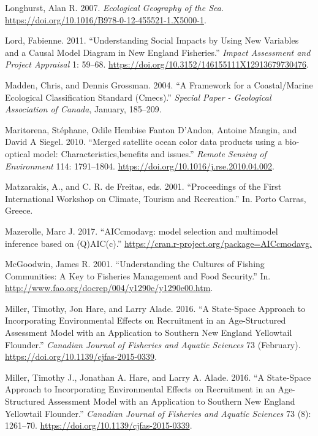 \documentclass[
]{book}
\newlength{\cslhangindent}
\newenvironment{cslreferences}%
  {\setlength{\parindent}{0pt}%
  \everypar{\setlength{\hangindent}{\cslhangindent}}\ignorespaces}%
  {\par}
\begin{document}
\begin{cslreferences}
\leavevmode\hypertarget{ref-Longhurst2007}{}%
Longhurst, Alan R. 2007. \emph{Ecological Geography of the Sea}. \url{https://doi.org/10.1016/B978-0-12-455521-1.X5000-1}.

\leavevmode\hypertarget{ref-lord_understanding_2011}{}%
Lord, Fabienne. 2011. ``Understanding Social Impacts by Using New Variables and a Causal Model Diagram in New England Fisheries.'' \emph{Impact Assessment and Project Appraisal} 1: 59--68. \url{https://doi.org/10.3152/146155111X12913679730476}.

\leavevmode\hypertarget{ref-madden2004}{}%
Madden, Chris, and Dennis Grossman. 2004. ``A Framework for a Coastal/Marine Ecological Classification Standard (Cmecs).'' \emph{Special Paper - Geological Association of Canada}, January, 185--209.

\leavevmode\hypertarget{ref-Maritorena2010}{}%
Maritorena, Stéphane, Odile Hembise Fanton D'Andon, Antoine Mangin, and David A Siegel. 2010. ``Merged satellite ocean color data products using a bio-optical model: Characteristics,benefits and issues.'' \emph{Remote Sensing of Environment} 114: 1791--1804. \url{https://doi.org/10.1016/j.rse.2010.04.002}.

\leavevmode\hypertarget{ref-matzarakis_proceedings_2001}{}%
Matzarakis, A., and C. R. de Freitas, eds. 2001. ``Proceedings of the First International Workshop on Climate, Tourism and Recreation.'' In. Porto Carras, Greece.

\leavevmode\hypertarget{ref-Mazerolle2017a}{}%
Mazerolle, Marc J. 2017. ``AICcmodavg: model selection and multimodel inference based on (Q)AIC(c).'' \url{https://cran.r-project.org/package=AICcmodavg.}

\leavevmode\hypertarget{ref-mcgoodwin_understanding_2001}{}%
McGoodwin, James R. 2001. ``Understanding the Cultures of Fishing Communities: A Key to Fisheries Management and Food Security.'' In. \url{http://www.fao.org/docrep/004/y1290e/y1290e00.htm}.

\leavevmode\hypertarget{ref-miller2016}{}%
Miller, Timothy, Jon Hare, and Larry Alade. 2016. ``A State-Space Approach to Incorporating Environmental Effects on Recruitment in an Age-Structured Assessment Model with an Application to Southern New England Yellowtail Flounder.'' \emph{Canadian Journal of Fisheries and Aquatic Sciences} 73 (February). \url{https://doi.org/10.1139/cjfas-2015-0339}.

\leavevmode\hypertarget{ref-miller_state-space_2016}{}%
Miller, Timothy J., Jonathan A. Hare, and Larry A. Alade. 2016. ``A State-Space Approach to Incorporating Environmental Effects on Recruitment in an Age-Structured Assessment Model with an Application to Southern New England Yellowtail Flounder.'' \emph{Canadian Journal of Fisheries and Aquatic Sciences} 73 (8): 1261--70. \url{https://doi.org/10.1139/cjfas-2015-0339}.


\end{cslreferences}
\end{document}

